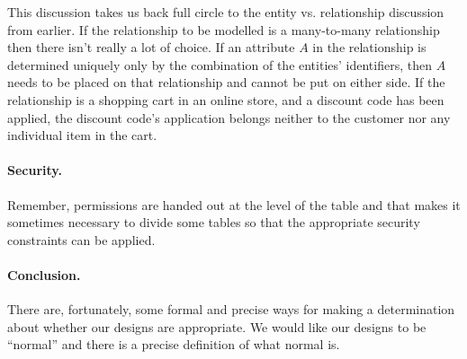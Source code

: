 This discussion takes us back full circle to the entity vs. relationship discussion from earlier. If the relationship to be modelled is a many-to-many relationship then there isn't really a lot of choice. If an attribute $A$ in the relationship is determined uniquely only by the combination of the entities' identifiers, then $A$ needs to be placed on that relationship and cannot be put on either side. If the relationship is a shopping cart in an online store, and a discount code has been applied, the discount code's application belongs neither to the customer nor any individual item in the cart.

\paragraph{Security.} Remember, permissions are handed out at the level of the table and that makes it sometimes necessary to divide some tables so that the appropriate security constraints can be applied. 

\paragraph{Conclusion.} There are, fortunately, some formal and precise ways for making a determination about whether our designs are appropriate. We would like our designs to be ``normal'' and there is a precise definition of what normal is. 




